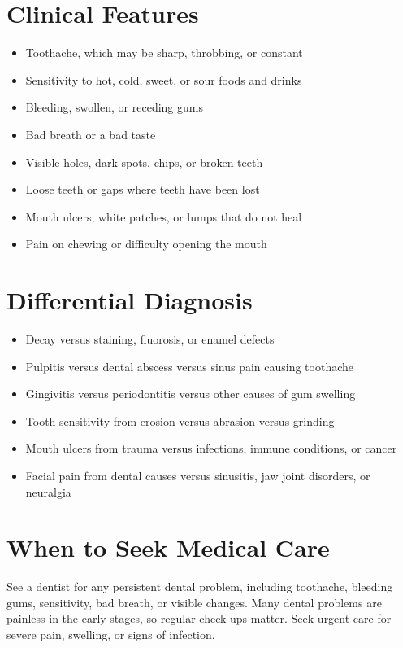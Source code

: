\section*{Clinical Features}
\begin{itemize}
    \item Toothache, which may be sharp, throbbing, or constant
    \item Sensitivity to hot, cold, sweet, or sour foods and drinks
    \item Bleeding, swollen, or receding gums
    \item Bad breath or a bad taste
    \item Visible holes, dark spots, chips, or broken teeth
    \item Loose teeth or gaps where teeth have been lost
    \item Mouth ulcers, white patches, or lumps that do not heal
    \item Pain on chewing or difficulty opening the mouth
\end{itemize}

\section*{Differential Diagnosis}
\begin{itemize}
    \item Decay versus staining, fluorosis, or enamel defects
    \item Pulpitis versus dental abscess versus sinus pain causing toothache
    \item Gingivitis versus periodontitis versus other causes of gum swelling
    \item Tooth sensitivity from erosion versus abrasion versus grinding
    \item Mouth ulcers from trauma versus infections, immune conditions, or cancer
    \item Facial pain from dental causes versus sinusitis, jaw joint disorders, or neuralgia
\end{itemize}

\section*{When to Seek Medical Care}
See a dentist for any persistent dental problem, including toothache, bleeding gums, sensitivity, bad breath, or visible changes. Many dental problems are painless in the early stages, so regular check-ups matter. Seek urgent care for severe pain, swelling, or signs of infection.


